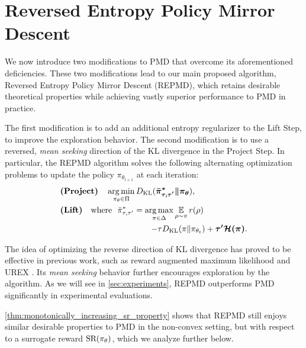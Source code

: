 

\section{Reversed Entropy Policy Mirror Descent}
\label{subsec:repmd}

We now introduce two modifications to PMD that overcome 
its aforementioned deficiencies.
These two modifications lead to our main proposed algorithm,
Reversed Entropy Policy Mirror Descent (REPMD),
which retains desirable theoretical properties while achieving
vastly superior performance to PMD in practice.

The first modification is to add an additional entropy regularizer
to the Lift Step,
to improve the exploration behavior. %
The second modification is to use a reversed, \emph{mean seeking} direction
of the KL divergence in the Project Step.
In particular, the REPMD algorithm solves the following 
alternating
optimization problems to update the policy $\pi_{\theta_{t+1}}$
at each iteration:
%
{\small
\begin{equation}
\label{eq:repmd}
\begin{split}
&\text{\bf (Project)} \quad  \argmin\limits_{\pi_\theta \in \Pi}{\KL(\bm{ \bar{\pi}_{\tau,\tau^{\prime}}^* \| \pi_\theta }) }, \\
&\text{\bf (Lift)} \quad \text{where}\ \ \bar{\pi}_{\tau,\tau^{\prime}}^*  =  \argmax\limits_{\pi \in \Delta}{ \ep\limits_{\rho \sim \pi}{  r(\rho) }} \\
&\qquad \qquad \qquad \qquad \qquad \quad {{ - \tau \KL(\pi \| \pi_{\theta_t}) + \bm{\tau^{\prime} \cH(\pi)} }}.
\end{split}
\end{equation}
}
%

The idea of optimizing the reverse direction of KL divergence has proved
to be effective in previous work,
such as reward augmented maximum likelihood \citep{norouzi2016reward}
and UREX \citep{nachum2017improving}.
Its \emph{mean seeking} behavior further encourages exploration by the
algorithm.
As we will see in \cref{sec:experiments},
REPMD outperforms PMD significantly in experimental evaluations.

\cref{thm:monotonically_increasing_sr_property}
shows that REPMD still enjoys similar desirable properties to PMD
in the non-convex setting,
but with respect to a surrogate reward $\text{SR}(\pi_\theta)$,
which we analyze further below.

